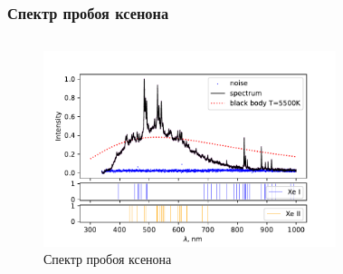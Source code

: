 \documentclass{beamer}
\begin{document}
		
	\begin{frame}
		\frametitle{Спектр пробоя ксенона}
		\begin{columns}
			\begin{figure}
				\centering
				\includegraphics[width=1.1\linewidth]{gen/xe_lines.pdf}
				\caption*{Спектр пробоя ксенона}
			\end{figure}	
			\begin{figure}
				\centering

\end{figure}
\end{columns}
\end{frame}
\end{document}

